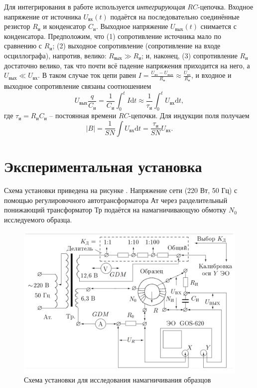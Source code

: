 \documentclass[a4paper,10pt]{article}
\begin{document}
Для интегрирования в работе используется \textit{интегрирующая} $RC$-цепочка. Входное напряжение от источника $U_{\text{вх}}(t)$ подаётся на последовательно соединённые резистор $R_{\text{и}}$ и конденсатор $C_{\text{и}}$. Выходное напряжение $U_{\text{вых}}(t)$ снимается с конденсатора. Предположим, что (1) сопротивление источника мало по сравнению с $R_{\text{и}}$; (2) выходное сопротивление (сопротивление на входе осциллографа), напротив, велико: $R_{\text{вых}}\gg R_{\text{и}}$; и, наконец, (3) сопротивление $R_{\text{и}}$ достаточно велико, так что почти всё падение напряжения приходится на него, а $U_{\text{вых}}\ll U_{\text{вх}}$. В таком случае ток цепи равен $I=\frac{U_{\text{вх}}-U_{\text{вых}}}{R_{\text{и}}}\approx\frac{U_{\text{вх}}}{R_{\text{и}}}$, и входное и выходное сопротивление связаны соотношением\[U_{\text{вых}}\frac{q}{C_{\text{и}}}=\frac{1}{C_{\text{и}}}\int_0^tI\text{d}t\approx\frac{1}{\tau_{\text{и}}}\int_0^tU_{\text{вх}}\text{d}t,\]где $\tau_{\text{и}}=R_{\text{и}}C_{\text{и}}$ -- постоянная времени $RC$-цепочки. Для индукции поля получаем\[\left|B\right|=\frac{1}{SN}\int U_{\text{вх}}\text{d}t=\frac{\tau_{\text{и}}}{SN}U_{\text{вх}}.\]

\section*{Экспериментальная установка}

Схема установки приведена на рисунке . Напряжение сети (220 Вт, 50 Гц) с помощью регулировочного автотрансформатора Ат через разделительный понижающий трансформатор Тр подаётся на намагничивающую обмотку $N_0$ исследуемого образца.

\begin{figure}[h]
	\centering
	\includegraphics[scale=0.35]{Device}
	\caption{Схема установки для исследования намагничивания образцов} \label{Device}
\end{figure}
\end{document}
